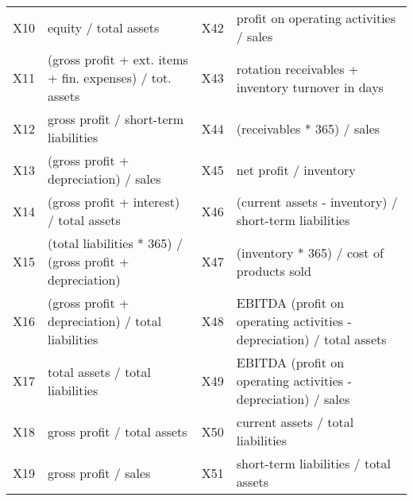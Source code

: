 \documentclass[12pt]{article}  %
\theoremstyle{definition}
\theoremstyle{remark}
\begin{document}
\begin{table}[!h]
{\begin{tabular}{llll}
X10 & equity / total assets                                                                                                    & X42 & profit on operating activities / sales                                                        \\
X11 & (gross profit + ext. items + fin. expenses) / tot. assets                                                 & X43 & rotation receivables + inventory turnover in days                                             \\
X12 & gross profit / short-term liabilities                                                                                    & X44 & (receivables * 365) / sales                                                                   \\
X13 & (gross profit + depreciation) / sales                                                                                    & X45 & net profit / inventory                                                                        \\
X14 & (gross profit + interest) / total assets                                                                                 & X46 & (current assets - inventory) / short-term liabilities                                         \\
X15 & (total liabilities * 365) / (gross profit + depreciation)                                                                & X47 & (inventory * 365) / cost of products sold                                                     \\
X16 & (gross profit + depreciation) / total liabilities                                                                        & X48 & EBITDA (profit on operating activities - depreciation) / total assets                         \\
X17 & total assets / total liabilities                                                                                         & X49 & EBITDA (profit on operating activities - depreciation) / sales                                \\
X18 & gross profit / total assets                                                                                              & X50 & current assets / total liabilities                                                            \\
X19 & gross profit / sales                                                                                                     & X51 & short-term liabilities / total assets                                                         \\

\end{tabular}}
\end{table}
\end{document}
